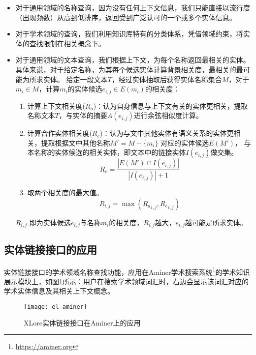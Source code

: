\begin{itemize}
\item 对于通用领域的名称查询，因为没有任何上下文信息，我们只能直接以流行度（出现频数）从高到低排序，返回受到广泛认可的一个或多个实体信息。
\item 对于学术领域的查询，我们利用知识库特有的分类体系，凭借领域约束，将实体的查找限制在相关概念下。

\item 对于通用领域的文本查询，我们根据上下文，为每个名称返回最相关的实体。具体来说，对于给定名称，为其每个候选实体计算背景相关度，最相关的最可能为所求实体。
给定一段文本$T$，经过实体抽取后获得实体名称集合$M$，对于$m_i \in M$，计算$m_i$的实体候选$e_{i,j} \in E(m_i)$的相关度：
\begin{enumerate}[1)]
\item 计算上下文相关度($R_a$)：认为自身信息与上下文有关的实体更相关，提取名称文本$T$，与实体的摘要$A(e_{i,j})$进行余弦相似度计算。

\item 计算合作实体相关度($R_e$)：认为与文中其他实体有语义关系的实体更相关，提取根据文中其他名称$M'= M -\{m_i\}$ 对应的实体候选$E(M')$，
与本名称的实体候选的相关实体，即文本中的链接实体$I(e_{i,j})$做交集。
\begin{equation}
{ R }_{ e }=\frac { \left| E\left( M' \right) \cap I\left( { e }_{ i,j } \right)  \right|  }{ \left| I\left( { e }_{ i,j } \right)  \right| +1 }
\end{equation}

\item 取两个相关度的最大值。
\begin{equation}
R_{i,j} = \max{ \left({R_a}_{i,j}, {R_e}_{i,j} \right)}
\end{equation}
\end{enumerate}
$R_{i,j}$ 即为实体候选$e_{i,j}$与名称$m_i$的相关度，$R_{i,j}$越大，$e_{i,j}$越可能是所求实体。
\end{itemize}

\subsection{实体链接接口的应用}
实体链接接口的学术领域名称查找功能，应用在Aminer学术搜索系统\footnote{\url{https://aminer.org}}的学术知识展示模块上，如图\ref{fig:el-aminer}所示：用户在搜索学术领域词汇时，右边会显示该词汇对应的学术实体信息及其相关上下文概念。
\begin{figure}[ht]
  \centering
  \texttt{[image: el-aminer]}
  \caption{XLore实体链接接口在Aminer上的应用}
  \label{fig:el-aminer}
\end{figure}

